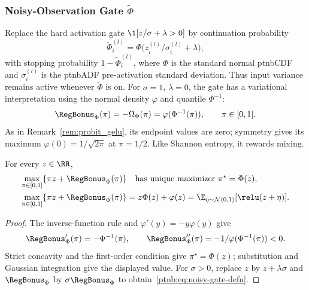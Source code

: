 \subsubsection{Noisy-Observation Gate \texorpdfstring{$\tilde\Phi$}{Phi}}\label{ptnb:app:noisy-gate-mode}

Replace the hard activation gate $\1[z/\sigma+\lambda>0]$ by continuation probability
\begin{equation}\label{ptnb:eq:noisy-gate-defn}
    \tilde\Phi_i^{(l)}=\Phi\bigl(z_i^{(l)}/\sigma_i^{(l)}+\lambda\bigr),
\end{equation}
with stopping probability $1-\tilde\Phi_i^{(l)}$, where $\Phi$ is the standard normal \ac{ptnbCDF} and
$\sigma_i^{(l)}$ is the \ac{ptnbADF} pre-activation standard deviation.
Thus input variance remains active whenever $\tilde\Phi$ is on. For $\sigma=1$,
$\lambda=0$, the gate has a variational interpretation using the normal density $\varphi$ and quantile
$\Phi^{-1}$:
\begin{equation}\label{ptnb:eq:noisy-gate-regulariser}
    \RegBonus_\Phi(\pi)=-\Omega_\Phi(\pi)=\varphi(\Phi^{-1}(\pi)),\qquad \pi\in[0,1].
\end{equation}
As in Remark~\ref{rem:probit_gelu}, its endpoint values are zero; symmetry gives its maximum $\varphi(0)=1/\sqrt{2\pi}$ at $\pi=1/2$.
Like Shannon entropy, it rewards mixing.

\begin{lemmaenv}\label{ptnb:lem:noisy-gate-dual}
For every $z\in\RR$,
\begin{align}
    \max_{\pi\in[0,1]}\{\pi z+\RegBonus_\Phi(\pi)\}
        &\quad\text{has unique maximizer }\pi^\star=\Phi(z),\label{ptnb:eq:noisy-gate-objective}\\
    \max_{\pi\in[0,1]}\{\pi z+\RegBonus_\Phi(\pi)\}
        &=z\Phi(z)+\varphi(z)=\E_{\eta\sim\mathcal N(0,1)}[\relu(z+\eta)].\label{ptnb:eq:noisy-gate-optimum}
\end{align}
\end{lemmaenv}
\begin{proof}
The inverse-function rule and $\varphi'(y)=-y\varphi(y)$ give
\begin{equation}\label{ptnb:eq:noisy-gate-deriv}
    \RegBonus_\Phi'(\pi)=-\Phi^{-1}(\pi),\qquad
    \RegBonus_\Phi''(\pi)=-1/\varphi(\Phi^{-1}(\pi))<0.
\end{equation}
Strict concavity and the first-order condition give $\pi^\star=\Phi(z)$; substitution and Gaussian
integration give the displayed value. For $\sigma>0$, replace $z$ by $z+\lambda\sigma$ and
$\RegBonus_\Phi$ by $\sigma\RegBonus_\Phi$ to obtain~\eqref{ptnb:eq:noisy-gate-defn}.
\end{proof}


